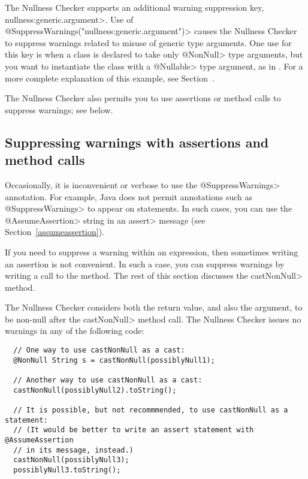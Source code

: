 The Nullness Checker supports an additional warning suppression key,
\<nullness:generic.argument>.
Use of \<@SuppressWarnings("nullness:generic.argument")> causes the Nullness
Checker to suppress warnings related to misuse of generic type
arguments.  One use for this key is when a class is declared to take only
\<@NonNull> type arguments, but you want to instantiate the class with a
\<@Nullable> type argument, as in .  For a more
complete explanation of this example, see
Section~.

The Nullness Checker also permits you to use assertions or method calls to
suppress warnings; see below.



\subsection{Suppressing warnings with assertions and method calls\label{suppressing-warnings-with-assertions}}

Occasionally, it is inconvenient or
verbose to use the \<@SuppressWarnings> annotation.  For example, Java does
not permit annotations such as \<@SuppressWarnings> to appear on statements.
In such cases, you can use the \<@AssumeAssertion> string in
an \<assert> message (see Section~\ref{assumeassertion}).

If you need to suppress a warning within an expression, then
sometimes writing an assertion is not convenient.  In such a case,
you can suppress warnings by writing a call to the
 method.
The rest of this section discusses the \<castNonNull> method.

The Nullness Checker considers both the return value, and also the
argument, to be non-null after the \<castNonNull> method call.
The Nullness Checker issues no warnings in any of the following
code:

\begin{Verbatim}
  // One way to use castNonNull as a cast:
  @NonNull String s = castNonNull(possiblyNull1);

  // Another way to use castNonNull as a cast:
  castNonNull(possiblyNull2).toString();

  // It is possible, but not recommmended, to use castNonNull as a statement:
  // (It would be better to write an assert statement with @AssumeAssertion
  // in its message, instead.)
  castNonNull(possiblyNull3);
  possiblyNull3.toString();
\end{Verbatim}

